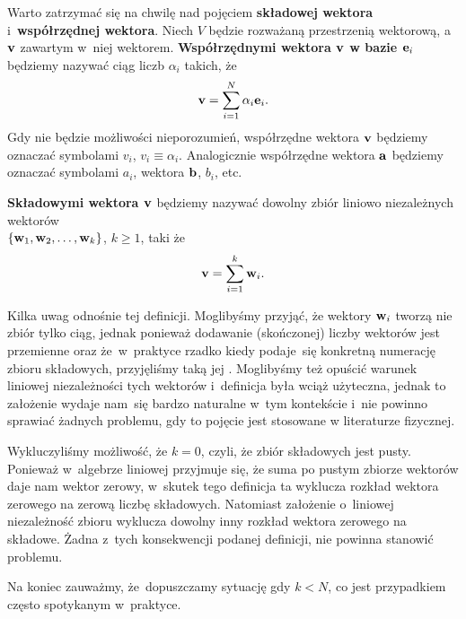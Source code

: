 \documentclass[a4paper,11pt]{article}
\begin{document}
 Warto zatrzymać się na chwilę nad pojęciem \textbf{składowej
  wektora} i~\textbf{współrzędnej wektora}. Niech $V$ będzie rozważaną
przestrzenią wektorową, a~$\mathbf{v}$ zawartym w~niej wektorem.
\textbf{Współrzędnymi wektora $\mathbf{v}$ w bazie $\mathbf{e}_{ i }$}
będziemy nazywać ciąg liczb $\alpha_{ i }$ takich, że
\begin{equation}
  \label{eq:SkalmierskiMechanika-01}
  \mathbf{v} = \sum_{ i = 1 }^{ N } \alpha_{ i } \mathbf{e}_{ i }.
\end{equation}
Gdy nie będzie możliwości nieporozumień, współrzędne wektora $\mathbf{v}$
będziemy oznaczać symbolami $v_{ i }$, $v_{ i } \equiv \alpha_{ i }$. Analogicznie
współrzędne wektora $\mathbf{a}$ będziemy oznaczać symbolami $a_{ i }$,
wektora $\mathbf{b}$, $b_{ i }$, etc.

\textbf{Składowymi wektora $\mathbf{v}$} będziemy nazywać dowolny zbiór
liniowo niezależnych wektorów \\
$\{ \mathbf{w}_{ 1 }, \mathbf{w}_{ 2 }, \ldots, \mathbf{w}_{ k } \}$, $k \geq 1$, taki że
\begin{equation}
  \label{eq:SkalmierskiMechanika-02}
  \mathbf{v} = \sum_{ i = 1 }^{ k } \mathbf{w}_{ i }.
\end{equation}

Kilka uwag odnośnie tej definicji. Moglibyśmy przyjąć, że wektory
$\mathbf{w}_{ i }$ tworzą nie zbiór tylko ciąg, jednak ponieważ dodawanie
(skończonej) liczby wektorów jest przemienne oraz że~w~praktyce rzadko
kiedy podaje~się konkretną numerację zbioru składowych, przyjęliśmy taką
jej . Moglibyśmy też opuścić warunek liniowej niezależności tych
wektorów i~definicja była wciąż użyteczna, jednak to założenie wydaje
nam~się bardzo naturalne w~tym kontekście i~nie powinno sprawiać żadnych
problemu, gdy to pojęcie jest stosowane w literaturze fizycznej.

Wykluczyliśmy możliwość, że $k = 0$, czyli, że zbiór składowych jest pusty.
Ponieważ w~algebrze liniowej przyjmuje się, że suma po pustym zbiorze
wektorów daje nam wektor zerowy, w~skutek tego definicja ta wyklucza rozkład
wektora zerowego na zerową liczbę składowych. Natomiast założenie o~liniowej
niezależność zbioru wyklucza dowolny inny rozkład wektora zerowego na
składowe. Żadna z~tych konsekwencji podanej definicji, nie powinna stanowić
problemu.

Na koniec zauważmy, że~dopuszczamy sytuację gdy $k < N$, co jest przypadkiem
często spotykanym w~praktyce.

\vspace{\spaceFour}
\end{document}
